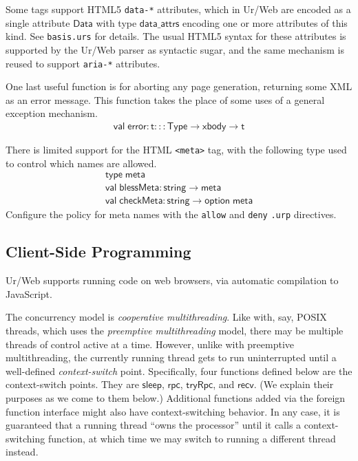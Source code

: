 \documentclass{article}
\newcommand{\mt}[1]{\mathsf{#1}}
\begin{document}
Some tags support HTML5 \texttt{data-*} attributes, which in Ur/Web are encoded as a single attribute $\mt{Data}$ with type $\mt{data\_attrs}$ encoding one or more attributes of this kind.  See \texttt{basis.urs} for details.  The usual HTML5 syntax for these attributes is supported by the Ur/Web parser as syntactic sugar, and the same mechanism is reused to support \texttt{aria-*} attributes.

One last useful function is for aborting any page generation, returning some XML as an error message.  This function takes the place of some uses of a general exception mechanism.
$$\begin{array}{l}
  \mt{val} \; \mt{error} : \mt{t} ::: \mt{Type} \to \mt{xbody} \to \mt{t}
\end{array}$$

There is limited support for the HTML \texttt{<meta>} tag, with the following type used to control which names are allowed.
$$\begin{array}{l}
  \mt{type} \; \mt{meta} \\
  \mt{val} \; \mt{blessMeta} : \mt{string} \to \mt{meta} \\
  \mt{val} \; \mt{checkMeta} : \mt{string} \to \mt{option} \; \mt{meta}
\end{array}$$
Configure the policy for meta names with the \texttt{allow} and \texttt{deny} \texttt{.urp} directives.


\subsection{Client-Side Programming}

Ur/Web supports running code on web browsers, via automatic compilation to JavaScript.

The concurrency model is \emph{cooperative multithreading}.  Like with, say, POSIX threads, which uses the \emph{preemptive multithreading} model, there may be multiple threads of control active at a time.  However, unlike with preemptive multithreading, the currently running thread gets to run uninterrupted until a well-defined \emph{context-switch} point.  Specifically, four functions defined below are the context-switch points.  They are $\mt{sleep}$, $\mt{rpc}$, $\mt{tryRpc}$, and $\mt{recv}$.  (We explain their purposes as we come to them below.)  Additional functions added via the foreign function interface might also have context-switching behavior.  In any case, it is guaranteed that a running thread ``owns the processor'' until it calls a context-switching function, at which time we may switch to running a different thread instead.
\end{document}
